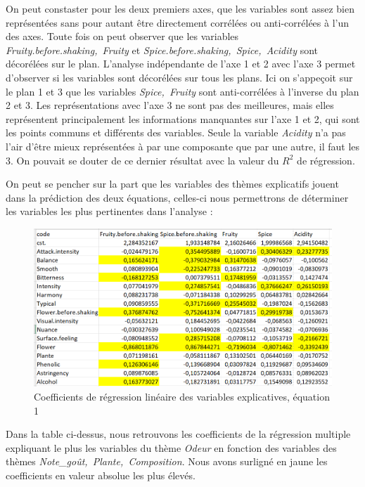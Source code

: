\documentclass[a4paper,french,10pt]{article}
\begin{document}
\newpage
On peut constaster pour les deux premiers axes, que les variables sont assez bien représentées sans pour autant être directement corrélées ou anti-corrélées à l'un des axes. Toute fois on peut observer que les variables \textit{Fruity.before.shaking,~Fruity} et \textit{Spice.before.shaking,~Spice,~Acidity} sont décorélées sur le plan. L'analyse indépendante de l'axe 1 et 2 avec l'axe 3 permet d'observer si les variables sont décorélées sur tous les plans. Ici on s'appeçoit sur le plan 1 et 3 que les variables \textit{Spice,~Fruity} sont anti-corrélées à l'inverse du plan 2 et 3. Les représentations avec l'axe 3 ne sont pas des meilleures, mais elles représentent principalement les informations manquantes sur l'axe 1 et 2, qui sont les points communs et différents des variables. Seule la variable \textit{Acidity} n'a pas l'air d'être mieux représentées à par une composante que par une autre, il faut les 3. On pouvait se douter de ce dernier résultat avec la valeur du $R^2$ de régression.\newline

On peut se pencher sur la part que les variables des thèmes explicatifs jouent dans la prédiction des deux équations, celles-ci nous permettrons de déterminer les variables les plus pertinentes dans l'analyse : 

\begin{figure}[htp] 
	\centering
	\includegraphics[scale=0.45]{images/Coeff_var_Eq1.png}
	\caption{Coefficients de régression linéaire des variables explicatives, équation 1}
\end{figure}

Dans la table ci-dessus, nous retrouvons les coefficients de la régression multiple expliquant le plus les variables du thème \textit{Odeur} en fonction des variables des thèmes \textit{Note\_goût,~Plante,~Composition}.
Nous avons surligné en jaune les coefficients en valeur absolue les plus élevés.
\end{document}

